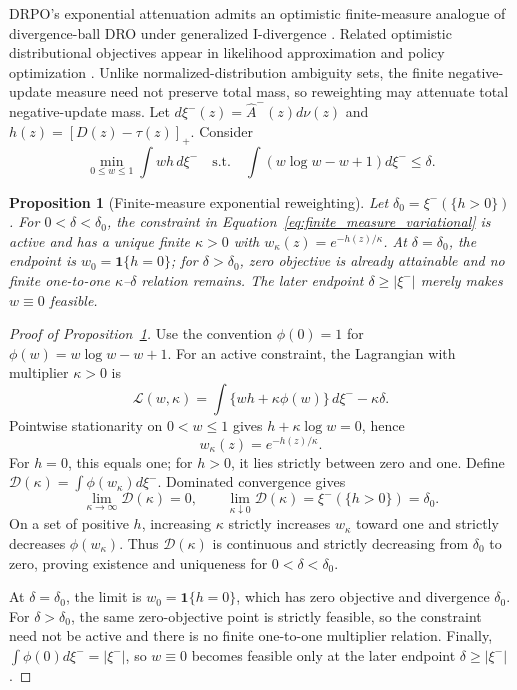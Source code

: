 \documentclass{article}
\theoremstyle{plain}
\newtheorem{proposition}[theorem]{Proposition}
\theoremstyle{definition}
\theoremstyle{remark}
\begin{document}
DRPO's exponential attenuation admits an optimistic finite-measure analogue
of divergence-ball DRO under generalized I-divergence
\citep{csiszar1975divergence}. Related optimistic distributional objectives
appear in likelihood approximation and policy optimization
\citep{nguyen2019optimistic,song2020optimistic}. Unlike
normalized-distribution ambiguity sets, the finite negative-update measure
need not preserve total mass, so reweighting may attenuate total
negative-update mass. Let
\(d\xi^-(z)=\widehat A^-(z)d\nu(z)\) and
\(h(z)=[D(z)-\tau(z)]_+\). Consider
\begin{equation}
\min_{0\le w\le1}\int wh\,d\xi^-
\quad\mathrm{s.t.}\quad
\int(w\log w-w+1)d\xi^-\le\delta.
\label{eq:finite_measure_variational}
\end{equation}

\begin{proposition}[Finite-measure exponential reweighting]
\label{prop:finite_measure_variational}
Let \(\delta_0=\xi^-(\{h>0\})\). For
\(0<\delta<\delta_0\), the constraint in
Equation~\eqref{eq:finite_measure_variational} is active and has a unique
finite \(\kappa>0\) with
\(w_\kappa(z)=e^{-h(z)/\kappa}\). At \(\delta=\delta_0\), the endpoint is
\(w_0=\mathbf1\{h=0\}\); for \(\delta>\delta_0\), zero objective is
already attainable and no finite one-to-one \(\kappa\)--\(\delta\)
relation remains. The later endpoint \(\delta\ge|\xi^-|\) merely makes
\(w\equiv0\) feasible.
\end{proposition}

\begin{proof}[Proof of Proposition~\ref{prop:finite_measure_variational}]
Use the convention
\(\phi(0)=1\) for
\(\phi(w)=w\log w-w+1\). For an active constraint, the Lagrangian with
multiplier \(\kappa>0\) is
\[
\mathcal L(w,\kappa)
=\int\{wh+\kappa\phi(w)\}\,d\xi^- -\kappa\delta.
\]
Pointwise stationarity on \(0<w\le1\) gives
\(h+\kappa\log w=0\), hence
\[
w_\kappa(z)=e^{-h(z)/\kappa}.
\]
For \(h=0\), this equals one; for \(h>0\), it lies strictly between
zero and one. Define
\(\mathcal D(\kappa)=\int\phi(w_\kappa)d\xi^-\). Dominated convergence gives
\[
\lim_{\kappa\to\infty}\mathcal D(\kappa)=0,
\qquad
\lim_{\kappa\downarrow0}\mathcal D(\kappa)
=\xi^-(\{h>0\})=\delta_0.
\]
On a set of positive \(h\), increasing \(\kappa\) strictly increases
\(w_\kappa\) toward one and strictly decreases \(\phi(w_\kappa)\).
Thus \(\mathcal D(\kappa)\) is continuous and strictly decreasing from
\(\delta_0\) to zero, proving existence and uniqueness for
\(0<\delta<\delta_0\).

At \(\delta=\delta_0\), the limit is
\(w_0=\mathbf1\{h=0\}\), which has zero objective and divergence
\(\delta_0\). For \(\delta>\delta_0\), the same zero-objective point is
strictly feasible, so the constraint need not be active and there is no
finite one-to-one multiplier relation. Finally,
\(\int\phi(0)d\xi^-=|\xi^-|\), so \(w\equiv0\) becomes feasible only at the later
endpoint \(\delta\ge|\xi^-|\).
\end{proof}
\end{document}
